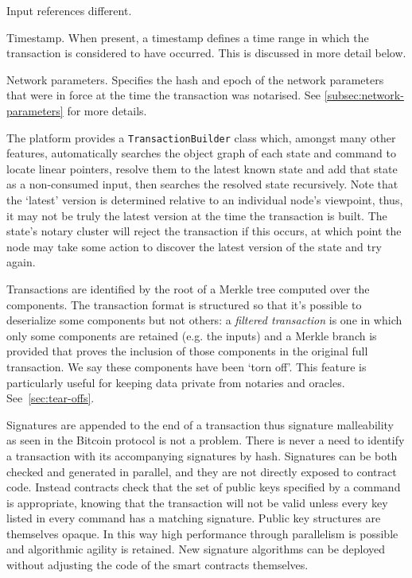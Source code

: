 \documentclass{article}
\begin{document}
\begin{labeling}{Input references}
different.
\item [Timestamp.] When present, a timestamp defines a time range in which the transaction is considered to
have occurred. This is discussed in more detail below.
\item [Network parameters.] Specifies the hash and epoch of the network parameters that were in force at the time the
transaction was notarised. See \cref{subsec:network-parameters} for more details.
\end{labeling}


The platform provides a \texttt{TransactionBuilder} class which, amongst many other features, automatically
searches the object graph of each state and command to locate linear pointers, resolve them to the latest known
state and add that state as a non-consumed input, then searches the resolved state recursively. Note that the `latest' version is determined relative to an
individual node's viewpoint, thus, it may not be truly the latest version at the time the transaction is built. The
state's notary cluster will reject the transaction if this occurs, at which point the node may take some action to
discover the latest version of the state and try again.

Transactions are identified by the root of a Merkle tree computed over the components. The transaction format is
structured so that it's possible to deserialize some components but not others: a \emph{filtered transaction} is
one in which only some components are retained (e.g. the inputs) and a Merkle branch is provided that proves the
inclusion of those components in the original full transaction. We say these components have been `torn off'. This
feature is particularly useful for keeping data private from notaries and oracles. See~\cref{sec:tear-offs}.

Signatures are appended to the end of a transaction thus signature malleability as seen in the Bitcoin protocol is
not a problem. There is never a need to identify a transaction with its accompanying signatures by hash. Signatures
can be both checked and generated in parallel, and they are not directly exposed to contract code. Instead
contracts check that the set of public keys specified by a command is appropriate, knowing that the transaction
will not be valid unless every key listed in every command has a matching signature. Public key structures are
themselves opaque. In this way high performance through parallelism is possible and algorithmic agility is
retained. New signature algorithms can be deployed without adjusting the code of the smart contracts themselves.
\end{document}
